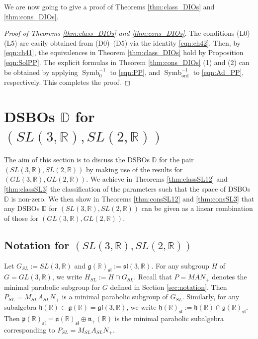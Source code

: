 \documentclass[a4paper,11pt,reqno]{amsart}
\newcommand{\fraka}{\mathfrak{a}}
\newcommand{\frakg}{\mathfrak{g}}
\newcommand{\frakh}{\mathfrak{h}}
\newcommand{\frakn}{\mathfrak{n}}
\newcommand{\frakp}{\mathfrak{p}}
\newcommand{\DD}{\mathbb{D}}
\newcommand{\0}{{\bf 0}}
\newcommand{\R}{\mathbb{R}}
\newcommand{\1}{{\bf 1}}
\newcommand{\ord}{{\mathrm{ord}}}
\newcommand{\fraksl}{{\mathfrak{sl}}}
\DeclareMathOperator{\Symb}{Symb}
\theoremstyle{plain}
\theoremstyle{definition}
\numberwithin{equation}{section}
\theoremstyle{definition}
\begin{document}
We are now going to give a proof of
Theorems \ref{thm:class_DIOs} and \ref{thm:cons_DIOs}.

\begin{proof}[Proof of  Theorems \ref{thm:class_DIOs} and \ref{thm:cons_DIOs}]
The conditions (L0)--(L5) are easily obtained from (D0)--(D5) via the identity 
\eqref{eqn:ch42}. Then, by \eqref{eqn:ch41}, the equivalences in 
Theorem \ref{thm:class_DIOs} hold by Proposition \eqref{eqn:SolPP}. The explicit formulas in Theorem \ref{thm:cons_DIOs} (1) and (2) can be obtained by applying $\Symb_0^{-1}$
to \eqref{eqn:PP}, and $\Symb_{\ord}^{-1}$ to \eqref{eqn:Ad_PP}, respectively.
This completes the proof.
\end{proof}

\section{DSBOs \texorpdfstring{$\DD$}{D} for \texorpdfstring{$(SL(3,\R), SL(2,\R))$}{(SL(3,R),SL(2,R))}}
\label{sec:SL}

The aim of this section is to discuss the DSBOs $\DD$ for the pair 
$(SL(3,\R), SL(2,\R))$ by making use of 
the results for $(GL(3,\R), GL(2,\R))$. 
We achieve in Theorems \ref{thm:classSL12} and \ref{thm:classSL3} 
the classification of the parameters such that 
the space of DSBOs $\DD$ is non-zero.
We then show in Theorems \ref{thm:consSL12} and \ref{thm:consSL3} 
that any DSBOs $\DD$ for 
$(SL(3,\R), SL(2,\R))$ can be given as a linear combination of those for $(GL(3,\R), GL(2,\R))$.


\subsection{Notation for \texorpdfstring{$(SL(3,\R), SL(2,\R))$}{(SL(3,R),SL(2,R))}}
\label{sec:SL_notation}

Let $G_{SL}:=SL(3,\R)$ and $\frakg(\R)_{\fraksl}:=\fraksl(3,\R)$.
For any subgroup $H$ of $G=GL(3,\R)$, we write $H_{SL}:=H \cap G_{SL}$.
Recall that $P=MAN_+$ denotes the minimal parabolic subgroup for $G$
defined in Section \ref{sec:notation}.
Then $P_{SL}=M_{SL}A_{SL}N_+$ is 
a minimal  parabolic subgroup of $G_{SL}$.
Similarly, for any subalgebra $\frakh(\R) \subset \frakg(\R)=\mathfrak{gl}(3,\R)$, we write
$\frakh(\R)_{\fraksl}:=\frakh(\R)\cap \frakg(\R)_{\fraksl}$. Then
$\frakp(\R)_{\fraksl}=\fraka(\R)_{\fraksl}\oplus \frakn_+(\R)$
is the minimal parabolic subalgebra corresponding to $P_{SL}=M_{SL}A_{SL}N_+$.
\end{document}
